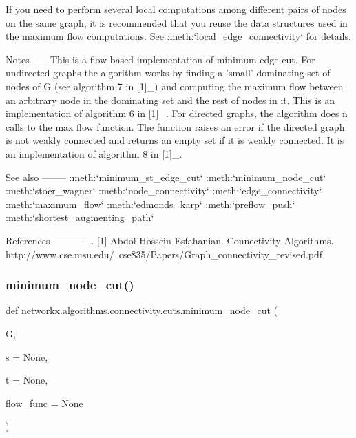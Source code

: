 \begin{DoxyVerb}
If you need to perform several local computations among different
pairs of nodes on the same graph, it is recommended that you reuse
the data structures used in the maximum flow computations. See
:meth:`local_edge_connectivity` for details.

Notes
-----
This is a flow based implementation of minimum edge cut. For
undirected graphs the algorithm works by finding a 'small' dominating
set of nodes of G (see algorithm 7 in [1]_) and computing the maximum
flow between an arbitrary node in the dominating set and the rest of
nodes in it. This is an implementation of algorithm 6 in [1]_. For
directed graphs, the algorithm does n calls to the max flow function.
The function raises an error if the directed graph is not weakly
connected and returns an empty set if it is weakly connected.
It is an implementation of algorithm 8 in [1]_.

See also
--------
:meth:`minimum_st_edge_cut`
:meth:`minimum_node_cut`
:meth:`stoer_wagner`
:meth:`node_connectivity`
:meth:`edge_connectivity`
:meth:`maximum_flow`
:meth:`edmonds_karp`
:meth:`preflow_push`
:meth:`shortest_augmenting_path`

References
----------
.. [1] Abdol-Hossein Esfahanian. Connectivity Algorithms.
    http://www.cse.msu.edu/~cse835/Papers/Graph_connectivity_revised.pdf\end{DoxyVerb}
 \mbox{\label{namespacenetworkx_1_1algorithms_1_1connectivity_1_1cuts_a95772f88e75165ca90e55d41fcaa0476}} 
\subsubsection{\texorpdfstring{minimum\+\_\+node\+\_\+cut()}{minimum\_node\_cut()}}
{\footnotesize\ttfamily def networkx.\+algorithms.\+connectivity.\+cuts.\+minimum\+\_\+node\+\_\+cut (\begin{DoxyParamCaption}\item[{}]{G,  }\item[{}]{s = {\ttfamily None},  }\item[{}]{t = {\ttfamily None},  }\item[{}]{flow\+\_\+func = {\ttfamily None} }\end{DoxyParamCaption})}

